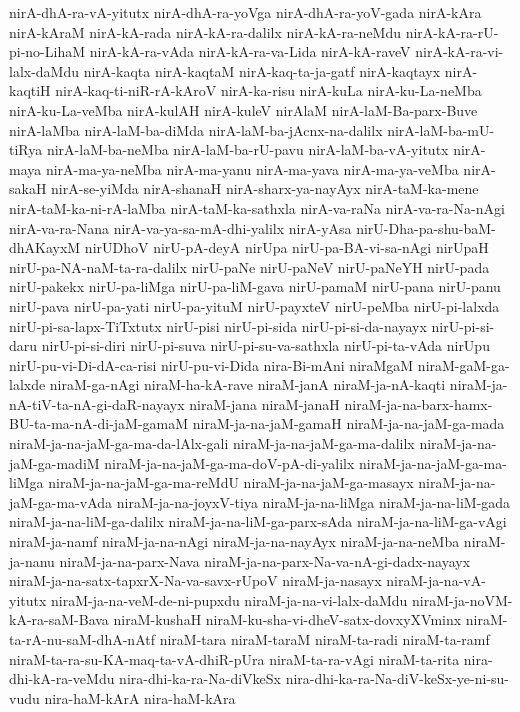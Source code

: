 {nirA-dhA-ra-vA-yitutx
nirA-dhA-ra-yoVga
nirA-dhA-ra-yoV-gada
nirA-kAra
nirA-kAraM
nirA-kA-rada
nirA-kA-ra-dalilx
nirA-kA-ra-neMdu
nirA-kA-ra-rU-pi-no-LihaM
nirA-kA-ra-vAda
nirA-kA-ra-va-Lida
nirA-kA-raveV
nirA-kA-ra-vi-lalx-daMdu
nirA-kaqta
nirA-kaqtaM
nirA-kaq-ta-ja-gatf
nirA-kaqtayx
nirA-kaqtiH
nirA-kaq-ti-niR-rA-kAroV
nirA-ka-risu
nirA-kuLa
nirA-ku-La-neMba
nirA-ku-La-veMba
nirA-kulAH
nirA-kuleV
nirAlaM
nirA-laM-Ba-parx-Buve
nirA-laMba
nirA-laM-ba-diMda
nirA-laM-ba-jAcnx-na-dalilx
nirA-laM-ba-mU-tiRya
nirA-laM-ba-neMba
nirA-laM-ba-rU-pavu
nirA-laM-ba-vA-yitutx
nirA-maya
nirA-ma-ya-neMba
nirA-ma-yanu
nirA-ma-yava
nirA-ma-ya-veMba
nirA-sakaH
nirA-se-yiMda
nirA-shanaH
nirA-sharx-ya-nayAyx
nirA-taM-ka-mene
nirA-taM-ka-ni-rA-laMba
nirA-taM-ka-sathxla
nirA-va-raNa
nirA-va-ra-Na-nAgi
nirA-va-ra-Nana
nirA-va-ya-sa-mA-dhi-yalilx
nirA-yAsa
nirU-Dha-pa-shu-baM-dhAKayxM
nirUDhoV
nirU-pA-deyA
nirUpa
nirU-pa-BA-vi-sa-nAgi
nirUpaH
nirU-pa-NA-naM-ta-ra-dalilx
nirU-paNe
nirU-paNeV
nirU-paNeYH
nirU-pada
nirU-pakekx
nirU-pa-liMga
nirU-pa-liM-gava
nirU-pamaM
nirU-pana
nirU-panu
nirU-pava
nirU-pa-yati
nirU-pa-yituM
nirU-payxteV
nirU-peMba
nirU-pi-lalxda
nirU-pi-sa-lapx-TiTxtutx
nirU-pisi
nirU-pi-sida
nirU-pi-si-da-nayayx
nirU-pi-si-daru
nirU-pi-si-diri
nirU-pi-suva
nirU-pi-su-va-sathxla
nirU-pi-ta-vAda
nirUpu
nirU-pu-vi-Di-dA-ca-risi
nirU-pu-vi-Dida
nira-Bi-mAni
niraMgaM
niraM-gaM-ga-lalxde
niraM-ga-nAgi
niraM-ha-kA-rave
niraM-janA
niraM-ja-nA-kaqti
niraM-ja-nA-tiV-ta-nA-gi-daR-nayayx
niraM-jana
niraM-janaH
niraM-ja-na-barx-hamx-BU-ta-ma-nA-di-jaM-gamaM
niraM-ja-na-jaM-gamaH
niraM-ja-na-jaM-ga-mada
niraM-ja-na-jaM-ga-ma-da-lAlx-gali
niraM-ja-na-jaM-ga-ma-dalilx
niraM-ja-na-jaM-ga-madiM
niraM-ja-na-jaM-ga-ma-doV-pA-di-yalilx
niraM-ja-na-jaM-ga-ma-liMga
niraM-ja-na-jaM-ga-ma-reMdU
niraM-ja-na-jaM-ga-masayx
niraM-ja-na-jaM-ga-ma-vAda
niraM-ja-na-joyxV-tiya
niraM-ja-na-liMga
niraM-ja-na-liM-gada
niraM-ja-na-liM-ga-dalilx
niraM-ja-na-liM-ga-parx-sAda
niraM-ja-na-liM-ga-vAgi
niraM-ja-namf
niraM-ja-na-nAgi
niraM-ja-na-nayAyx
niraM-ja-na-neMba
niraM-ja-nanu
niraM-ja-na-parx-Nava
niraM-ja-na-parx-Na-va-nA-gi-dadx-nayayx
niraM-ja-na-satx-tapxrX-Na-va-savx-rUpoV
niraM-ja-nasayx
niraM-ja-na-vA-yitutx
niraM-ja-na-veM-de-ni-pupxdu
niraM-ja-na-vi-lalx-daMdu
niraM-ja-noVM-kA-ra-saM-Bava
niraM-kushaH
niraM-ku-sha-vi-dheV-satx-dovxyXVminx
niraM-ta-rA-nu-saM-dhA-nAtf
niraM-tara
niraM-taraM
niraM-ta-radi
niraM-ta-ramf
niraM-ta-ra-su-KA-maq-ta-vA-dhiR-pUra
niraM-ta-ra-vAgi
niraM-ta-rita
nira-dhi-kA-ra-veMdu
nira-dhi-ka-ra-Na-diVkeSx
nira-dhi-ka-ra-Na-diV-keSx-ye-ni-su-vudu
nira-haM-kArA
nira-haM-kAra
}
